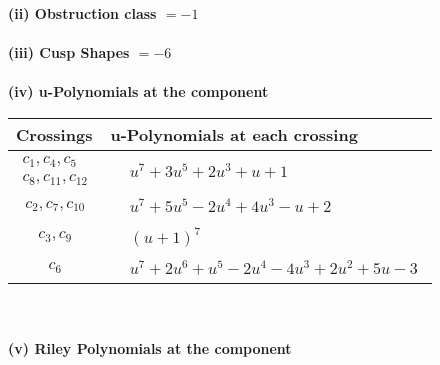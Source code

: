 \documentclass[1p]{elsarticle_modified}
\theoremstyle{definition}
\begin{document}
\flushleft \textbf{(ii) Obstruction class $= -1$}\\~\\
\flushleft \textbf{(iii) Cusp Shapes $= -6$}\\~\\
\newpage\renewcommand{\arraystretch}{1}
\flushleft \textbf{(iv) u-Polynomials at the component}\newline \\
\begin{tabular}{m{50pt}|m{274pt}}
Crossings & \hspace{64pt}u-Polynomials at each crossing \\
\hline $$\begin{aligned}c_{1},c_{4},c_{5}\\c_{8},c_{11},c_{12}\end{aligned}$$&$\begin{aligned}
&u^7+3 u^5+2 u^3+u+1
\end{aligned}$\\
\hline $$\begin{aligned}c_{2},c_{7},c_{10}\end{aligned}$$&$\begin{aligned}
&u^7+5 u^5-2 u^4+4 u^3- u+2
\end{aligned}$\\
\hline $$\begin{aligned}c_{3},c_{9}\end{aligned}$$&$\begin{aligned}
&(u+1)^7
\end{aligned}$\\
\hline $$\begin{aligned}c_{6}\end{aligned}$$&$\begin{aligned}
&u^7+2 u^6+u^5-2 u^4-4 u^3+2 u^2+5 u-3
\end{aligned}$\\
\hline
\end{tabular}\\~\\
\newpage\renewcommand{\arraystretch}{1}
\flushleft \textbf{(v) Riley Polynomials at the component}\newline \\
\end{document}
